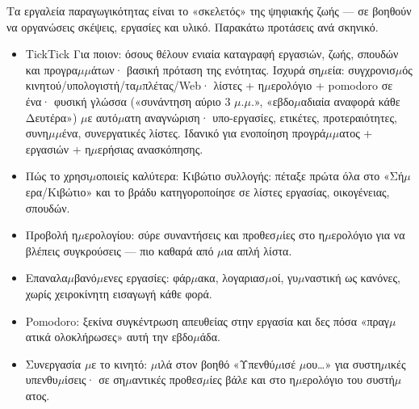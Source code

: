 


Τα εργαλεία παραγωγικότητας είναι το «σκελετός» της ψηφιακής ζωής — σε βοηθούν να οργανώσεις σκέψεις, εργασίες και υλικό. Παρακάτω προτάσεις ανά σκηνικό.


\begin{itemize}
  \item TickTick Για ποιον: όσους θέλουν ενιαία καταγραφή εργασιών, ζωής, σπουδών και προγρα$\mu$$\mu$άτων· βασική πρόταση της ενότητας. Ισχυρά ση$\mu$εία: συγχρονισ$\mu$ός κινητού/υπολογιστή/τα$\mu$πλέτας/Web· λίστες + η$\mu$ερολόγιο + pomodoro σε ένα· φυσική γλώσσα («συνάντηση αύριο 3 $\mu$.$\mu$.», «εβδο$\mu$αδιαία αναφορά κάθε Δευτέρα») $\mu$ε αυτό$\mu$ατη αναγνώριση· υπο-εργασίες, ετικέτες, προτεραιότητες, συνη$\mu$$\mu$ένα, συνεργατικές λίστες. Ιδανικό για ενοποίηση προγρά$\mu$$\mu$ατος + εργασιών + η$\mu$ερήσιας ανασκόπησης.
  \item Πώς το χρησι$\mu$οποιείς καλύτερα: Κιβώτιο συλλογής: πέταξε πρώτα όλα στο «Σή$\mu$ερα/Κιβώτιο» και το βράδυ κατηγοροποίησε σε λίστες εργασίας, οικογένειας, σπουδών.
  \item Προβολή η$\mu$ερολογίου: σύρε συναντήσεις και προθεσ$\mu$ίες στο η$\mu$ερολόγιο για να βλέπεις συγκρούσεις — πιο καθαρά από $\mu$ια απλή λίστα.
  \item Επαναλα$\mu$βανό$\mu$ενες εργασίες: φάρ$\mu$ακα, λογαριασ$\mu$οί, γυ$\mu$ναστική ως κανόνες, χωρίς χειροκίνητη εισαγωγή κάθε φορά.
  \item Pomodoro: ξεκίνα συγκέντρωση απευθείας στην εργασία και δες πόσα «πραγ$\mu$ατικά ολοκλήρωσες» αυτή την εβδο$\mu$άδα.
  \item Συνεργασία $\mu$ε το κινητό: $\mu$ιλά στον βοηθό «Υπενθύ$\mu$ισέ $\mu$ου…» για συστη$\mu$ικές υπενθυ$\mu$ίσεις· σε ση$\mu$αντικές προθεσ$\mu$ίες βάλε και στο η$\mu$ερολόγιο του συστή$\mu$ατος.
\end{itemize}

